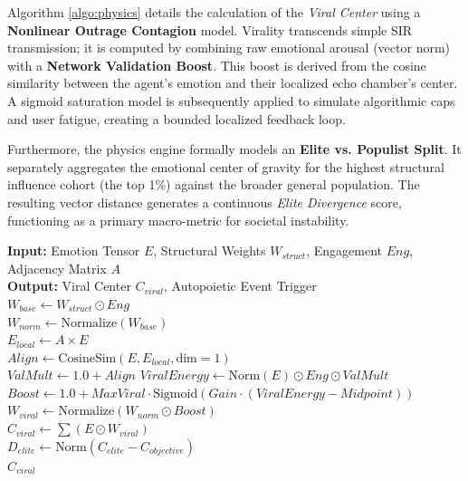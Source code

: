 \documentclass[12pt]{IEEEtran}
\begin{document}
Algorithm \ref{algo:physics} details the calculation of the \textit{Viral Center} using a \textbf{Nonlinear Outrage Contagion} model. Virality transcends simple SIR transmission; it is computed by combining raw emotional arousal (vector norm) with a \textbf{Network Validation Boost}. This boost is derived from the cosine similarity between the agent's emotion and their localized echo chamber's center. A sigmoid saturation model is subsequently applied to simulate algorithmic caps and user fatigue, creating a bounded localized feedback loop.

Furthermore, the physics engine formally models an \textbf{Elite vs. Populist Split}. It separately aggregates the emotional center of gravity for the highest structural influence cohort (the top 1\%) against the broader general population. The resulting vector distance generates a continuous \textit{Elite Divergence} score, functioning as a primary macro-metric for societal instability.

\begin{algorithm}
\caption{Nonlinear Emotional Contagion}
\label{algo:physics}
\SetAlgoLined
\textbf{Input:} Emotion Tensor $E$, Structural Weights $W_{struct}$, Engagement $Eng$, Adjacency Matrix $A$ \\
\textbf{Output:} Viral Center $C_{viral}$, Autopoietic Event Trigger \\
$W_{base} \gets W_{struct} \odot Eng$ \\
$W_{norm} \gets \text{Normalize}(W_{base})$ \\
$E_{local} \gets A \times E$ \\
$Align \gets \text{CosineSim}(E, E_{local}, \text{dim}=1)$ \\
$ValMult \gets 1.0 + Align$ 
$ViralEnergy \gets \text{Norm}(E) \odot Eng \odot ValMult$ \\
$Boost \gets 1.0 + MaxViral \cdot \text{Sigmoid}(Gain \cdot (ViralEnergy - Midpoint))$ \\
$W_{viral} \gets \text{Normalize}(W_{norm} \odot Boost)$ \\
$C_{viral} \gets \sum (E \odot W_{viral})$ \\
$D_{elite} \gets \text{Norm}(C_{elite} - C_{objective})$ \\
\Return $C_{viral}$
\end{algorithm}
\end{document}
